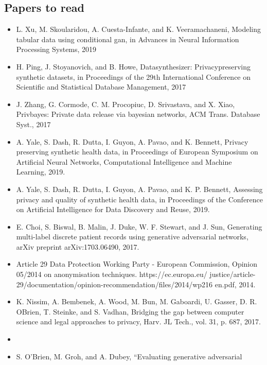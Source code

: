 \documentclass[11pt]{article}
\begin{document}
    \subsection{Papers to read}
    \begin{itemize}
        \item {} L. Xu, M. Skoularidou, A. Cuesta-Infante, and K. Veeramachaneni, Modeling tabular data using conditional gan, in Advances in Neural Information Processing Systems, 2019
        \item {} H. Ping, J. Stoyanovich, and B. Howe, Datasynthesizer: Privacypreserving synthetic datasets, in Proceedings of the 29th International Conference on Scientific and Statistical Database Management, 2017
        \item J. Zhang, G. Cormode, C. M. Procopiuc, D. Srivastava, and X. Xiao, Privbayes: Private data release via bayesian networks, ACM Trans. Database Syst., 2017
        \item {} A. Yale, S. Dash, R. Dutta, I. Guyon, A. Pavao, and K. Bennett, Privacy preserving synthetic health data, in Proceedings of European Symposium on Artificial Neural Networks, Computational Intelligence and Machine Learning, 2019.
        \item {} A. Yale, S. Dash, R. Dutta, I. Guyon, A. Pavao, and K. P. Bennett, Assessing privacy and quality of synthetic health data, in Proceedings of the Conference on Artificial Intelligence for Data Discovery and Reuse, 2019.
        \item {} E. Choi, S. Biswal, B. Malin, J. Duke, W. F. Stewart, and J. Sun, Generating multi-label discrete patient records using generative adversarial networks, arXiv preprint arXiv:1703.06490, 2017.
        \item Article 29 Data Protection Working Party - European Commission, Opinion 05/2014 on anonymisation techniques. https://ec.europa.eu/ justice/article-29/documentation/opinion-recommendation/files/2014/wp216 en.pdf, 2014.
        \item K. Nissim, A. Bembenek, A. Wood, M. Bun, M. Gaboardi, U. Gasser, D. R. OBrien, T. Steinke, and S. Vadhan, Bridging the gap between computer science and legal approaches to privacy, Harv. JL Tech., vol. 31, p. 687, 2017.
        \item {}
        \item S. O’Brien, M. Groh, and A. Dubey, “Evaluating generative adversarial

\end{itemize}
\end{document}
